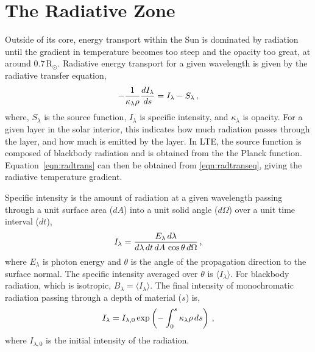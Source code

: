 \section{The Radiative Zone}\label{sect:radzone}

Outside of its core, energy transport within the Sun is dominated by radiation until the gradient in temperature becomes too steep and the opacity too great, at around $0.7$\,R$_{\odot}$. Radiative energy transport for a given wavelength is given by the radiative transfer equation,
\begin{equation}\label{eqn:radtranseq}
-\frac{1}{\kappa_\lambda \rho} \frac{d I_\lambda}{ds} = I_\lambda - S_\lambda \mbox{\,,}
\end{equation}
where, $S_\lambda$ is the source function, $I_\lambda$ is specific intensity, and $\kappa_\lambda$ is opacity. For a given layer in the solar interior, this indicates how much radiation passes through the layer, and how much is emitted by the layer. In \gls{LTE}, the source function is composed of blackbody radiation and is obtained from the the Planck function.
Equation~\ref{eqn:radtrans} can then be obtained from \ref{eqn:radtranseq}, giving the radiative temperature gradient.

Specific intensity is the amount of radiation at a given wavelength passing through a unit surface area ($dA$) into a unit solid angle ($d\Omega$) over a unit time interval ($dt$),
\begin{equation}
I_\lambda = \frac{E_\lambda\,d\lambda}{d\lambda\,dt\,dA\,\cos{\theta}\,d\Omega} \mbox{\,,}
\end{equation}
where $E_\lambda$ is photon energy and $\theta$ is the angle of the propagation direction to the surface normal. The specific intensity averaged over $\theta$ is $\langle I_\lambda \rangle$.
For blackbody radiation, which is isotropic, $B_\lambda=\langle I_\lambda \rangle$. The final intensity of monochromatic radiation passing through a depth of material ($s$) is,
\begin{equation}\label{eqn:intensif}
I_\lambda = I_{\lambda,0} \exp \left( {-\int_0^s \kappa_\lambda \rho\,ds} \right) \mbox{\,,}
\end{equation}
where $I_{\lambda,0}$ is the initial intensity of the radiation.

